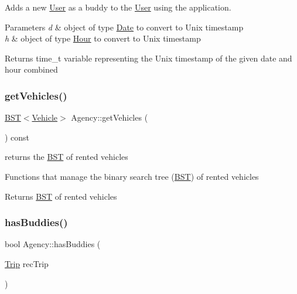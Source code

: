 Adds a new \hyperlink{class_user}{User} as a buddy to the \hyperlink{class_user}{User} using the application. 


\begin{DoxyParams}{Parameters}
{\em d} & object of type \hyperlink{class_date}{Date} to convert to Unix timestamp \\
\hline
{\em h} & object of type \hyperlink{class_hour}{Hour} to convert to Unix timestamp\\
\hline
\end{DoxyParams}
\begin{DoxyReturn}{Returns}
time\+\_\+t variable representing the Unix timestamp of the given date and hour combined 
\end{DoxyReturn}
\mbox{\label{class_agency_af7b06f6c289c6c6a7acf09dda8a6f7d5}} 
\subsubsection{\texorpdfstring{get\+Vehicles()}{getVehicles()}}
{\footnotesize\ttfamily \hyperlink{class_b_s_t}{B\+ST}$<$\hyperlink{class_vehicle}{Vehicle}$>$ Agency\+::get\+Vehicles (\begin{DoxyParamCaption}{ }\end{DoxyParamCaption}) const\hspace{0.3cm}{\ttfamily [inline]}}



returns the \hyperlink{class_b_s_t}{B\+ST} of rented vehicles 

Functions that manage the binary search tree (\hyperlink{class_b_s_t}{B\+ST}) of rented vehicles \begin{DoxyReturn}{Returns}
\hyperlink{class_b_s_t}{B\+ST} of rented vehicles 
\end{DoxyReturn}
\mbox{\label{class_agency_aa7fe817661a5e46322db9e809ac54fe9}} 
\subsubsection{\texorpdfstring{has\+Buddies()}{hasBuddies()}}
{\footnotesize\ttfamily bool Agency\+::has\+Buddies (\begin{DoxyParamCaption}\item[{\hyperlink{class_trip}{Trip}}]{rec\+Trip }\end{DoxyParamCaption})}



